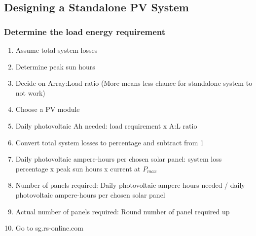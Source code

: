 \documentclass{article}
\begin{document}
\subsection{Designing a Standalone PV System}
\subsubsection{Determine the load energy requirement}
\begin{enumerate}
	\item Assume total system losses
	\item Determine peak sun hours
	\item Decide on Array:Load ratio (More means less chance for standalone system to not work)
	\item Choose a PV module
	\item Daily photovoltaic Ah needed: load requirement x A:L ratio
	\item Convert total system losses to percentage and subtract from 1
	\item Daily photovoltaic ampere-hours per chosen solar panel: system loss percentage x peak sun hours x current at $P_{max}$
	\item Number of panels required: Daily photovoltaic ampere-hours needed / daily photovoltaic ampere-hours per chosen solar panel
	\item Actual number of panels required: Round number of panel required up
	\item Go to sg.rs-online.com
\end{enumerate}
\end{document}
